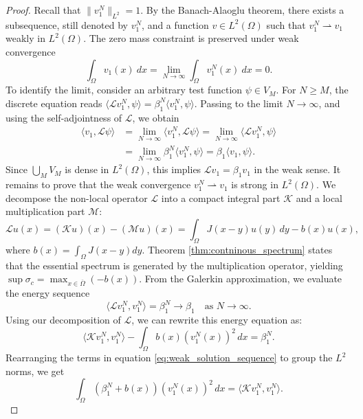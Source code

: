 \documentclass[10pt,a4paper]{amsart}
\begin{document}
\begin{proof}
    Recall that $\|v_1^N\|_{L^2} = 1$. By the Banach-Alaoglu theorem, there exists a subsequence, still denoted by $v_1^N$, and a function $v \in L^2(\Omega)$ such that $v_1^N \rightharpoonup v_1$ weakly in $L^2(\Omega)$. The zero mass constraint is preserved under weak convergence
    \begin{equation}
        \int_\Omega v_1(x) \:dx = \lim_{N \to \infty} \int_\Omega v_1^N(x) \:dx = 0.
    \end{equation}
    To identify the limit, consider an arbitrary test function $\psi \in V_M$. For $N \geq M$, the discrete equation reads $\langle \mathcal{L} v_1^N, \psi \rangle = \beta_1^N \langle v_1^N, \psi \rangle$. Passing to the limit $N \to \infty$, and using the self-adjointness of $\mathcal{L}$, we obtain
    \begin{align}
        \langle v_1, \mathcal{L} \psi \rangle &= \lim_{N \to \infty} \langle v_1^N, \mathcal{L} \psi \rangle = \lim_{N \to \infty} \langle \mathcal{L} v_1^N, \psi \rangle \\
        &= \lim_{N \to \infty} \beta_1^N \langle v_1^N, \psi \rangle = \beta_1 \langle v_1, \psi \rangle.
    \end{align}
    Since $\bigcup_{M} V_M$ is dense in $L^2(\Omega)$, this implies $\mathcal{L} v_1 = \beta_1 v_1$ in the weak sense. It remains to prove that the weak convergence $v_1^N \rightharpoonup v_1$ is strong in $L^2(\Omega)$. We decompose the non-local operator $\mathcal{L}$ into a compact integral part $\mathcal{K}$ and a local multiplication part $\mathcal{M}$:
    \begin{equation}
        \mathcal{L}u(x) = (\mathcal{K}u)(x) - (\mathcal{M}u)(x) = \int_\Omega J(x-y)u(y)\,dy - b(x)u(x),
    \end{equation}
    where $b(x) = \int_\Omega J(x-y)dy$. Theorem \ref{thm:contninous_spectrum} states that the essential spectrum is generated by the multiplication operator, yielding $\sup \sigma_c = \max_{x \in \overline{\Omega}} (-b(x))$. From the Galerkin approximation, we evaluate the energy sequence
    \begin{equation}
        \langle \mathcal{L} v_1^N, v_1^N \rangle = \beta_1^N \to \beta_1 \quad \text{as } N \to \infty.
    \end{equation}
    Using our decomposition of $\mathcal{L}$, we can rewrite this energy equation as:
    \begin{equation}
        \label{eq:weak_solution_sequence}
        \langle \mathcal{K} v_1^N, v_1^N \rangle - \int_\Omega b(x) (v_1^N(x))^2 \, dx = \beta_1^N.
    \end{equation}
    Rearranging the terms in equation \eqref{eq:weak_solution_sequence} to group the $L^2$ norms, we get
    \begin{equation} \label{eq:rearranged_energy}
        \int_\Omega (\beta_1^N + b(x)) (v_1^N(x))^2 \, dx = \langle \mathcal{K} v_1^N, v_1^N \rangle.
    \end{equation}
    

\end{proof}
\end{document}
